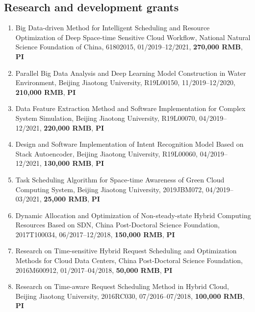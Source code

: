 \documentclass[margin,line]{res}
\begin{document}
\begin{resume}
\section{\sc Research and development grants}
\begin{enumerate}
	\item Big Data-driven Method for Intelligent Scheduling and Resource Optimization of Deep Space-time Sensitive Cloud Workflow, National Natural Science Foundation of China, 61802015, 01/2019--12/2021, \textbf{270,000 RMB}, \textbf{PI}
	\item Parallel Big Data Analysis and Deep Learning Model Construction in Water Environment, Beijing Jiaotong University, R19L00150, 11/2019--12/2020, \textbf{210,000 RMB}, \textbf{PI}
	\item Data Feature Extraction Method and Software Implementation for Complex System Simulation, Beijing Jiaotong University, R19L00070, 04/2019--12/2021, \textbf{220,000 RMB}, \textbf{PI}
	\item Design and Software Implementation of Intent Recognition Model Based on Stack Autoencoder, Beijing Jiaotong University, R19L00060, 04/2019--12/2021, \textbf{130,000 RMB}, \textbf{PI}
	\item Task Scheduling Algorithm for Space-time Awareness of Green Cloud Computing System, Beijing Jiaotong University, 2019JBM072, 04/2019--03/2021, \textbf{25,000 RMB}, \textbf{PI}
	\item Dynamic Allocation and Optimization of Non-steady-state Hybrid Computing Resources Based on SDN, China Post-Doctoral Science Foundation, 2017T100034, 06/2017--12/2018, \textbf{150,000 RMB}, \textbf{PI}
	\item Research on Time-sensitive Hybrid Request Scheduling and Optimization Methods for Cloud Data Centers, China Post-Doctoral Science Foundation, 2016M600912, 01/2017--04/2018, \textbf{50,000 RMB}, \textbf{PI}
	\item Research on Time-aware Request Scheduling Method in Hybrid Cloud, Beijing Jiaotong University, 2016RC030, 07/2016--07/2018, \textbf{100,000 RMB}, \textbf{PI}
\end{enumerate}


\end{resume}
\end{document}
